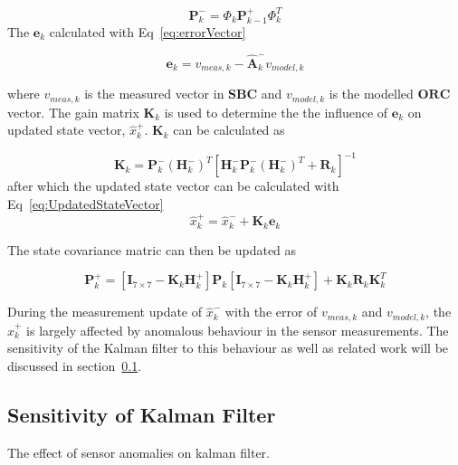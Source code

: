 \documentclass[letterpaper, 10 pt, conference]{ieeeconf}  %
\begin{document}
\begin{equation}
	\mathbf{P}_k^- = \Phi_k \mathbf{P}_{k-1}^+ \Phi_k ^T
	\label{eq:P_k}
\end{equation}
The $\mathbf{e}_k$ calculated with Eq~\ref{eq:errorVector}

\begin{equation}
\mathbf{e}_k = v_{meas,k} - \hat{\mathbf{A}}_k^- v_{model,k}
\label{eq:errorVector}
\end{equation}

where $v_{meas,k}$ is the measured vector in $\mathbf{SBC}$ and $v_{model,k}$ is the modelled $\mathbf{ORC}$ vector. The gain matrix $\mathbf{K}_k$ is used to determine the the influence of $\mathbf{e}_k$ on updated state vector, $\hat{x}_k^+$. $\mathbf{K}_k$ can be calculated as 

\begin{equation}
\mathbf{K}_k = \mathbf{P}_k^- (\mathbf{H}_k^-)^T \left[\mathbf{H}_k^- \mathbf{P}_k^- (\mathbf{H}_k^-)^T + \mathbf{R}_k \right]^{-1}
\end{equation}
 after which the updated state vector can be calculated with Eq~\ref{eq:UpdatedStateVector}
\begin{equation}
\hat{x}_k^+ = \hat{x}_k^- + \mathbf{K}_k \mathbf{e}_k
\label{eq:UpdatedStateVector}
\end{equation}

The state covariance matric can then be updated as

\begin{equation}
	\mathbf{P}_k^+ = \left[\mathbf{I}_{7 \times 7} - \mathbf{K}_k \mathbf{H}_k^+ \right]\mathbf{P}_k \left[\mathbf{I}_{7 \times 7} - \mathbf{K}_k \mathbf{H}_k^+ \right] + \mathbf{K}_k \mathbf{R}_k \mathbf{K}_k^T
	\label{eq:Updated_P_k}
\end{equation}

During the measurement update of $\hat{x}_k^-$ with the error of $v_{meas,k}$ and $v_{model,k}$, the $\hat{x}_k^+$ is largely affected by anomalous behaviour in the sensor measurements. The sensitivity of the Kalman filter to this behaviour as well as related work will be discussed in section~\ref{subsection:SensitivityOfKalmanFilter}.

\subsection{Sensitivity of Kalman Filter}
\label{subsection:SensitivityOfKalmanFilter}
The effect of sensor anomalies on kalman filter.
\end{document}
